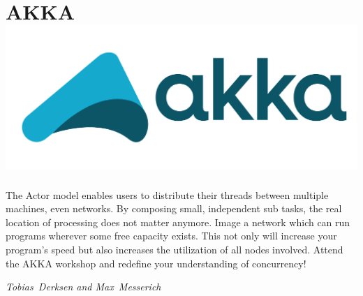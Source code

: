 


\section*{AKKA\hfill\includegraphics[width=.5\linewidth]{images/akka_full_color.pdf}}
The Actor model enables users to distribute their threads between
multiple machines, even networks. By composing small, independent sub
tasks, the real location of processing does not matter anymore. Image
a network which can run programs wherever some free capacity
exists. This not only will increase your program’s speed but also
increases the utilization of all nodes involved. 
Attend the AKKA workshop and redefine your understanding of
concurrency!

\hfill\textit{Tobias~Derksen and Max~Messerich}

